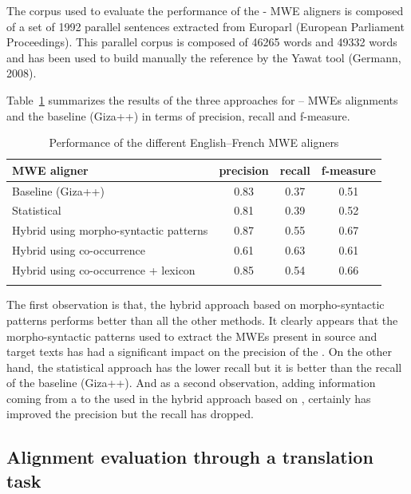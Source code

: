 \documentclass[output=paper,modfonts,nonflat]{langsci/langscibook}
\begin{document}
The corpus used to evaluate the performance of the - MWE aligners is composed of a set of 1992 parallel sentences extracted from Europarl (European Parliament Proceedings). This parallel corpus is composed of 46265  words and 49332  words and has been used to build manually the reference  by the Yawat tool (Germann, 2008).

Table~\ref{sem:tab:resultsPRF_en-fr} summarizes the results of the three approaches for -- MWEs alignments and the baseline (Giza++) in terms of precision, recall and f-measure.

\begin{table}
\caption{Performance of the different English--French MWE aligners}
\label{sem:tab:resultsPRF_en-fr}
 \begin{tabular}{p{6.5cm}ccc}
  \lsptoprule
            \textnormal{MWE aligner} & \textnormal{precision} & \textnormal{recall} & \textnormal{f-measure} \\
  \midrule
Baseline (Giza++) & 0.83 & 0.37 & 0.51 \\
Statistical & 0.81 & 0.39 & 0.52 \\
Hybrid using morpho-syntactic patterns & 0.87 & 0.55 & 0.67 \\
Hybrid using co-occurrence & 0.61 & 0.63 & 0.61 \\
Hybrid using co-occurrence + lexicon & 0.85 & 0.54 & 0.66 \\
  \lspbottomrule
 \end{tabular}
\end{table}



The first observation is that, the hybrid approach based on morpho-syntactic patterns performs better than all the other methods. It clearly appears that the morpho-syntactic patterns used to extract the MWEs present in source and target texts has had a significant impact on the precision of the . On the other hand, the statistical approach has the lower recall but it is better than the recall of the baseline (Giza++). And as a second observation, adding information coming from a  to the  used in the hybrid approach based on , certainly has improved the precision but the recall has dropped.

\subsection{Alignment evaluation through a translation task}
\end{document}
